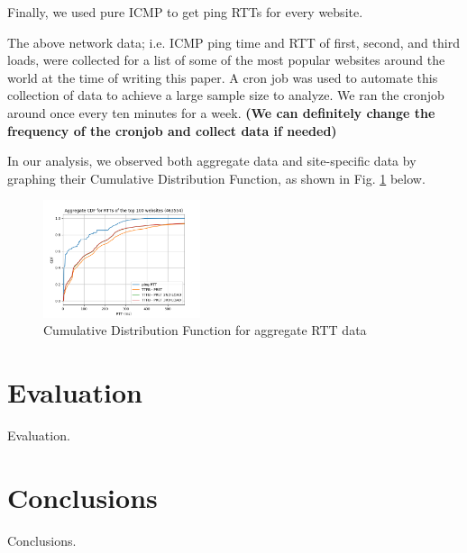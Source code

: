 \documentclass[twocolumn, 10pt, conference]{IEEEtran}
\begin{document}
Finally, we used pure ICMP to get ping RTTs for every website. %

The above network data; i.e. ICMP ping time and RTT of first, second, and third loads, were collected for a list of some of the most popular websites around the world at the time of writing this paper. A cron job was used to automate this collection of data to achieve a large sample size to analyze. We ran the cronjob around once every ten minutes for a week.
\textbf{(We can definitely change the frequency of the cronjob and collect data if needed)}

In our analysis, we observed both aggregate data and site-specific data by graphing their Cumulative Distribution Function, as shown in Fig. \ref{fig:example} below.

\begin{figure}[h]
\centering
    \includegraphics[width=0.41\textwidth]{fig/aggregategraph}
     \caption{Cumulative Distribution Function for aggregate RTT data}
      \label{fig:example}
\end{figure}


\section{Evaluation}
\label{sec:evaluation}


Evaluation.

\section{Conclusions}
\label{sec:conclusions}



Conclusions.






\end{document}
